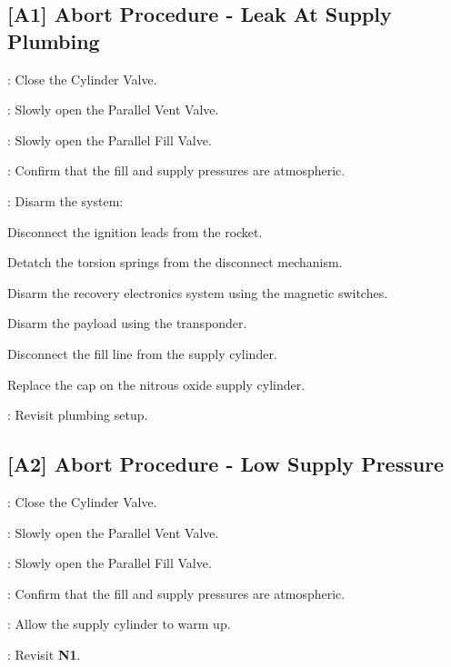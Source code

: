 \subsection{[A1] Abort Procedure - Leak At Supply Plumbing}
\begin{checklist}
    \item \primary{}: Close the Cylinder Valve.
    \item \primary{}: Slowly open the Parallel Vent Valve.
    \item \primary{}: Slowly open the Parallel Fill Valve.
    \item \control{}: Confirm that the fill and supply pressures are atmospheric.
    \item \primary{}: Disarm the system:
        \begin{checklist}    
            \item Disconnect the ignition leads from the rocket.
            \item Detatch the torsion springs from the disconnect mechanism.
            \item Disarm the recovery electronics system using the magnetic switches.
            \item Disarm the payload using the transponder.
            \item Disconnect the fill line from the supply cylinder.
            \item Replace the cap on the nitrous oxide supply cylinder.
        \end{checklist}
    \item \ops{}: Revisit plumbing setup.
\end{checklist}
\setcounter{checklistnum}{0}

\subsection{[A2] Abort Procedure - Low Supply Pressure}
\begin{checklist}
    \item \primary{}: Close the Cylinder Valve.
    \item \primary{}: Slowly open the Parallel Vent Valve.
    \item \primary{}: Slowly open the Parallel Fill Valve.
    \item \control{}: Confirm that the fill and supply pressures are atmospheric.
    \item \primary{}: Allow the supply cylinder to warm up.
    \item \ops{}: Revisit \textbf{N1}.
\end{checklist}
\setcounter{checklistnum}{0}

